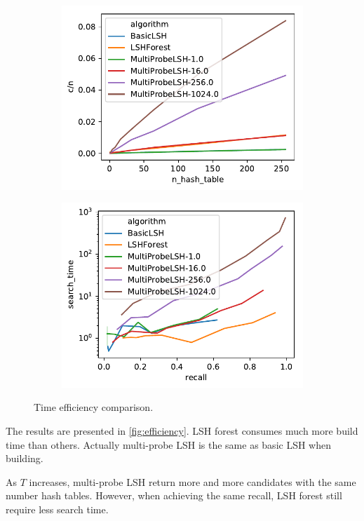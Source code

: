 \begin{figure}[hbt]
\begin{subfigure}{\columnwidth}
  \includegraphics[width=\columnwidth]{figures/c_n}
\end{subfigure}
\begin{subfigure}{\columnwidth}
  \includegraphics[width=\columnwidth]{figures/recall_search_time}
\end{subfigure}
\caption{Time efficiency comparison.}
\end{figure}

The results are presented in \cref{fig:efficiency}.
LSH forest consumes much more build time than others.
Actually multi-probe LSH is the same as basic LSH when building.

As $T$ increases, multi-probe LSH return more and more candidates with the same number hash tables.
However, when achieving the same recall, LSH forest still require less search time.








